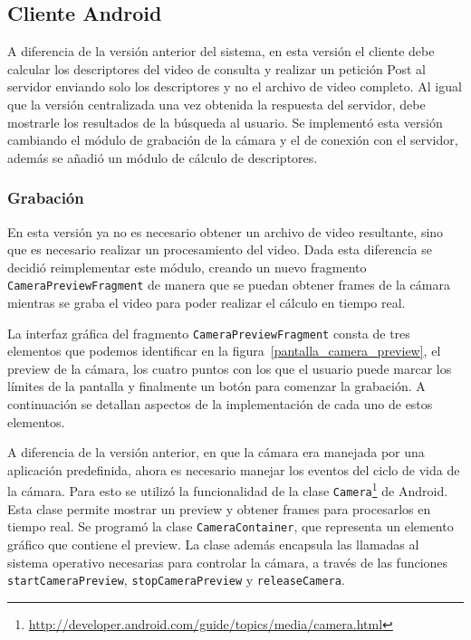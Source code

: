 \subsection{Cliente Android}
A diferencia de la versión anterior del sistema, en esta versión el cliente debe calcular los descriptores del video de consulta y realizar un petición Post al servidor enviando solo los descriptores y no el archivo de video completo. Al igual que la versión centralizada una vez obtenida la respuesta del servidor, debe mostrarle los resultados de la búsqueda al usuario. Se implementó esta versión cambiando el módulo de grabación de la cámara y el de conexión con el servidor, además se añadió un módulo de cálculo de descriptores.

\subsubsection*{Grabación}
En esta versión ya no es necesario obtener un archivo de video resultante, sino que es necesario realizar un procesamiento del video. Dada esta diferencia se decidió reimplementar este módulo, creando un nuevo fragmento \texttt{CameraPreviewFragment} de manera que se puedan obtener frames de la cámara mientras se graba el video para poder realizar el cálculo en tiempo real.

La interfaz gráfica del fragmento \texttt{CameraPreviewFragment} consta de tres elementos que podemos identificar en la figura~\ref{pantalla_camera_preview}, el preview de la cámara, los cuatro puntos con los que el usuario puede marcar los límites de la pantalla y finalmente un botón para comenzar la grabación. A continuación se detallan aspectos de la implementación de cada uno de estos elementos.

A diferencia de la versión anterior, en que la cámara era manejada por una aplicación predefinida, ahora es necesario manejar los eventos del ciclo de vida de la cámara. Para esto se utilizó la funcionalidad de la clase \texttt{Camera}\footnote{\url{http://developer.android.com/guide/topics/media/camera.html}} de Android. Esta clase permite mostrar un preview y obtener frames para procesarlos en tiempo real. Se programó la clase \texttt{CameraContainer}, que representa un elemento gráfico que contiene el preview. La clase además encapsula las llamadas al sistema operativo necesarias para controlar la cámara, a través de las funciones \texttt{startCameraPreview}, \texttt{stopCameraPreview} y \texttt{releaseCamera}.

